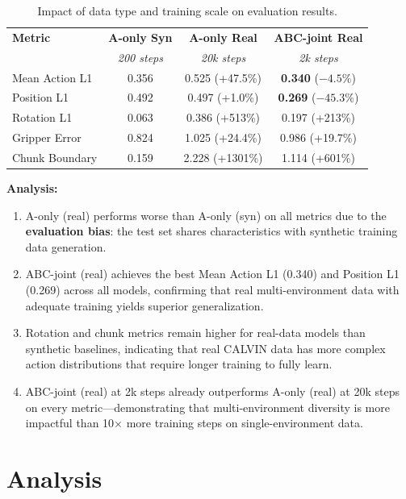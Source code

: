 \documentclass[10pt,twocolumn]{article}
\begin{document}
\begin{table}[H]
\centering
\caption{Impact of data type and training scale on evaluation results.}
\label{tab:syn_real}
\begin{tabular}{lccc}
\toprule
\textbf{Metric} & \textbf{A-only Syn} & \textbf{A-only Real} & \textbf{ABC-joint Real} \\
 & \textit{200 steps} & \textit{20k steps} & \textit{2k steps} \\
\midrule
Mean Action L1 & 0.356 & 0.525 (+47.5\%) & \textbf{0.340} ($-4.5\%$) \\
Position L1 & 0.492 & 0.497 (+1.0\%) & \textbf{0.269} ($-45.3\%$) \\
Rotation L1 & 0.063 & 0.386 (+513\%) & 0.197 (+213\%) \\
Gripper Error & 0.824 & 1.025 (+24.4\%) & 0.986 (+19.7\%) \\
Chunk Boundary & 0.159 & 2.228 (+1301\%) & 1.114 (+601\%) \\
\bottomrule
\end{tabular}
\end{table}

\textbf{Analysis:}
\begin{enumerate}[nosep]
    \item A-only (real) performs worse than A-only (syn) on all metrics due to the \textbf{evaluation bias}: the test set shares characteristics with synthetic training data generation.
    \item ABC-joint (real) achieves the best Mean Action L1 (0.340) and Position L1 (0.269) across all models, confirming that real multi-environment data with adequate training yields superior generalization.
    \item Rotation and chunk metrics remain higher for real-data models than synthetic baselines, indicating that real CALVIN data has more complex action distributions that require longer training to fully learn.
    \item ABC-joint (real) at 2k steps already outperforms A-only (real) at 20k steps on every metric---demonstrating that multi-environment diversity is more impactful than 10$\times$ more training steps on single-environment data.
\end{enumerate}

\section{Analysis}
\end{document}
